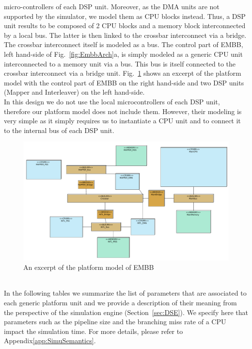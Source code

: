 \documentclass{llncs}
\begin{document}
micro-controllers of each DSP unit. Moreover, as the DMA units are not supported by the simulator, we model them as CPU
blocks instead. Thus, a DSP unit results to be composed of 2 CPU blocks and a memory block interconnected by a local
bus. The latter is then linked to the crossbar interconnect via a bridge. The crossbar interconnect itself is modeled as
a bus. The control part of EMBB, left hand-side of Fig.~\ref{fig:EmbbArch}a, is simply modeled as a generic CPU unit
interconnected to a memory unit via a bus. This bus is itself connected to the crossbar interconnect via a bridge
unit. Fig.~\ref{fig:SamplePlatform} shows an excerpt of the platform model with the control part of EMBB on the right
hand-side and two DSP units (Mapper and Interleaver) on the left hand-side.\\
%
In this design we do not use the local microcontrollers of each DSP unit, therefore our platform model does not include
them. However, their modeling is very simple as it simply requires us to instantiate a CPU unit and to connect it to the
internal bus of each DSP unit.
%
\begin{figure}[!htbp]
	\centering
	\includegraphics[angle=-90,origin=c,height=0.9\paperwidth]{figures/evaluation/Excerpt.pdf}
    \caption{An excerpt of the platform model of EMBB}
	\label{fig:SamplePlatform}
\end{figure}
%
%
\\In the following tables we summarize the list of parameters that are associated to each generic platform unit and we
provide a description of their meaning from the perspective of the simulation engine (Section~\ref{sec:DSE}). We specify
here that parameters such as the pipeline size and the branching miss rate of a CPU impact the simulation time. For more
details, please refer to Appendix\ref{app:SimuSemantics}.
\end{document}
